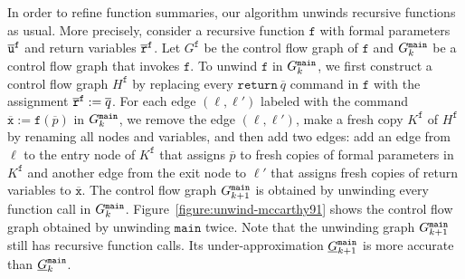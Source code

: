 In order to refine function summaries, our algorithm unwinds recursive
functions as usual. More precisely, consider a recursive function
$\mathtt{f}$ with formal parameters $\overline{\mathtt{u}}^{\mathtt{{f}}}$
and return variables $\overline{\mathtt{r}}^{\mathtt{{f}}}$. Let 
$G^{\mathtt{f}}$ be  
the control flow graph of $\mathtt{f}$ and $G^{\mathtt{{main}}}_k$ be a
control flow graph 
that invokes $\mathtt{f}$. To unwind $\mathtt{f}$ in $G^{\mathtt{{main}}}_k$, 
we first construct a control flow graph $H^{\mathtt{f}}$ by 
replacing every $\mathtt{return}\ \overline{q}$ command in
$\mathtt{f}$ with the assignment $\mathtt{\overline{r}}^{\mathtt{{f}}} :=
\overline{q}$. For each edge $(\ell,  
\ell')$ labeled with the command $\overline{\mathtt{x}} :=
\mathtt{f}(\overline{p})$ in $G^{\mathtt{{main}}}_k$, we remove 
the edge $(\ell, \ell')$, make a fresh copy $K^{\mathtt{f}}$ of $H^{\mathtt{f}}$ by
renaming all nodes and variables, and then add two edges: add an edge
from $\ell$ to the entry node of $K^{\mathtt{f}}$ that assigns
$\overline{p}$ to fresh copies of formal parameters in 
$K^{\mathtt{f}}$ and another edge from the exit node to $\ell'$ that
assigns fresh copies of return variables to
$\overline{\mathtt{x}}$. The control flow graph $G^{\mathtt{{main}}}_{k+1}$ 
is obtained by unwinding every function call in $G^{\mathtt{{main}}}_k$. 
Figure~\ref{figure:unwind-mccarthy91} shows the control flow graph
obtained by unwinding $\mathtt{main}$ twice. Note that the
unwinding graph $G^{\mathtt{{main}}}_{k+1}$ still has recursive function calls. Its
under-approximation $\underline{G}^{\mathtt{{main}}}_{k+1}$ is more
accurate than $\underline{G}^{\mathtt{{main}}}_k$. 

